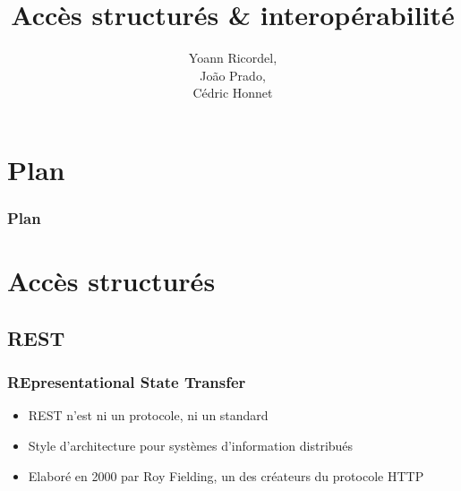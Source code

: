\documentclass{beamer}
\begin{document}
\title{Accès structurés \& interopérabilité}
\author{Yoann Ricordel, \\João Prado, \\Cédric Honnet}
\titlepage

\section{Plan}
    \begin{frame}
        \frametitle{Plan}
        \tableofcontents
    \end{frame}

\section{Accès structurés}

    \subsection{REST}
        \begin{frame}
            \frametitle{REpresentational State Transfer}
            \begin{itemize}
                \item REST n'est ni un protocole, ni un standard \pause
                \item Style d’architecture pour systèmes d'information distribués \pause
                \item Elaboré en 2000 par Roy Fielding, un des créateurs du protocole HTTP
            \end{itemize}
        \end{frame}
\end{document}
